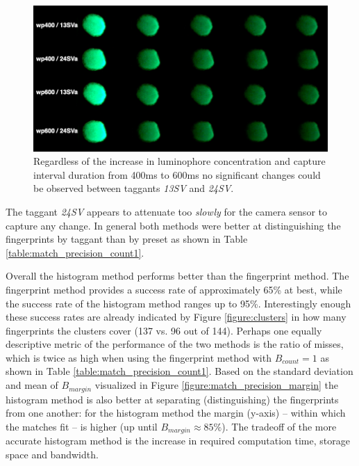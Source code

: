 \documentclass[thesis.tex]{subfiles}
\begin{document}
\begin{figure}[h!]
  \vspace{-2mm}
  \centering \includegraphics[page=1,width=\textwidth]{images/findings/SV}
  \vspace{-8mm}
  \caption{Regardless of the increase in luminophore concentration and capture interval duration from 400ms to 600ms no significant changes could be observed between taggants \emph{13SV} and \emph{24SV}.}
  \label{figure:SV}
\end{figure}

\noindent The taggant \emph{24SV} appears to attenuate too \emph{slowly} for the camera sensor to capture any change. In general both methods were better at distinguishing the fingerprints by taggant than by preset as shown in Table \ref{table:match_precision_count1}.

Overall the histogram method performs better than the fingerprint method. The fingerprint method provides a success rate of approximately 65\% at best, while the success rate of the histogram method ranges up to 95\%. Interestingly enough these success rates are already indicated by Figure \ref{figure:clusters} in how many fingerprints the clusters cover (137 vs. 96 out of 144). Perhaps one equally descriptive metric of the performance of the two methods is the ratio of misses, which is twice as high when using the fingerprint method with $B_{count} = 1$ as shown in Table \ref{table:match_precision_count1}. Based on the standard deviation and mean of $B_{margin}$ visualized in Figure \ref{figure:match_precision_margin} the histogram method is also better at separating (distinguishing) the fingerprints from one another: for the histogram method the margin (y-axis) -- within which the matches fit -- is higher (up until $B_{margin} \approx 85\%$). The tradeoff of the more accurate histogram method is the increase in required computation time, storage space and bandwidth.
\end{document}

